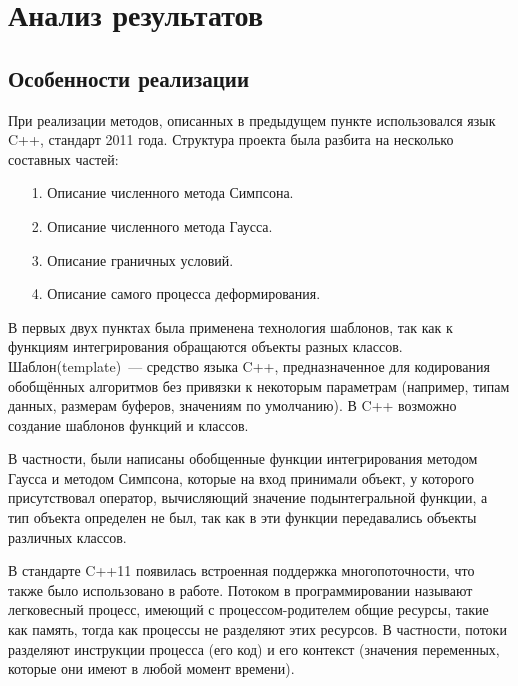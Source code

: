 \chapter{Анализ результатов\label{chapter_2}}
\setcounter{figure}{5}
\section{Особенности реализации}

При реализации методов, описанных в предыдущем пункте использовался язык C++, стандарт 2011 года.
Структура проекта была разбита на несколько составных частей:
\begin{itemize}
\item[1.] Описание численного метода Симпсона.
\item[2.] Описание численного метода Гаусса.
\item[3.] Описание граничных условий.
\item[4.] Описание самого процесса деформирования.
\end{itemize}

В первых двух пунктах была применена технология шаблонов, так как к функциям интегрирования обращаются объекты разных классов.
Шаблон(template)~--- средство языка C++, предназначенное для кодирования обобщённых алгоритмов без привязки к некоторым параметрам (например, типам данных, размерам буферов, значениям по умолчанию). В C++ возможно создание шаблонов функций и классов.

В частности, были написаны обобщенные функции интегрирования методом Гаусса и методом Симпсона, которые на вход принимали объект, у которого присутствовал оператор, вычисляющий значение подынтегральной функции, а тип объекта определен не был, так как в эти функции передавались объекты различных классов. 

В стандарте C++11 появилась встроенная поддержка многопоточности, что также было использовано в работе.
Потоком в программировании называют легковесный процесс, имеющий с процессом-родителем общие ресурсы, такие как память, тогда как процессы не разделяют этих ресурсов. В частности, потоки разделяют инструкции процесса (его код) и его контекст (значения переменных, которые они имеют в любой момент времени).

